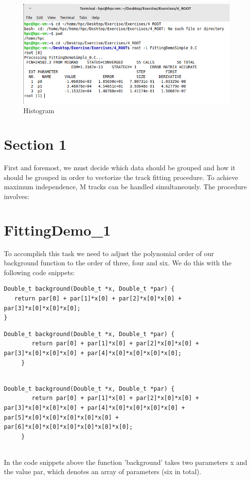 \documentclass{article}
\begin{document}
 \begin{figure}[H]
    \centering
    \includegraphics[scale=0.3]{metrics.png} 
    \caption{Histogram}
    \label{fig:graph}
    \end{figure}

\section*{Section 1}

First and foremost, we must decide which data should be
grouped and how it should be grouped in order to vectorize
the track fitting procedure.
To achieve maximum independence, M tracks can be handled simultaneously.
The procedure involves:

\section*{FittingDemo\_1}
To accomplish this task we need to adjust the polynomial order of our background function
to the order of three, four and six. We do this with the following code snippets: \\[3mm]

\begin{lstlisting}[caption=Order 3]
    Double_t background(Double_t *x, Double_t *par) {
   return par[0] + par[1]*x[0] + par[2]*x[0]*x[0] + par[3]*x[0]*x[0]*x[0];
}

\end{lstlisting}
\begin{lstlisting}[caption=Order 4]
    Double_t background(Double_t *x, Double_t *par) {
        return par[0] + par[1]*x[0] + par[2]*x[0]*x[0] + par[3]*x[0]*x[0]*x[0] + par[4]*x[0]*x[0]*x[0]*x[0];
     }
     
\end{lstlisting}
\begin{lstlisting}[caption=Order 6]
    Double_t background(Double_t *x, Double_t *par) {
        return par[0] + par[1]*x[0] + par[2]*x[0]*x[0] + par[3]*x[0]*x[0]*x[0] + par[4]*x[0]*x[0]*x[0]*x[0] + par[5]*x[0]*x[0]*x[0]*x[0]*x[0] + par[6]*x[0]*x[0]*x[0]*x[0]*x[0]*x[0];
     }
     

\end{lstlisting}

In the code snippets above the function 'background' takes two parameters x and the value par, which denotes
an array of parameters (six in total).

  
\end{document}
